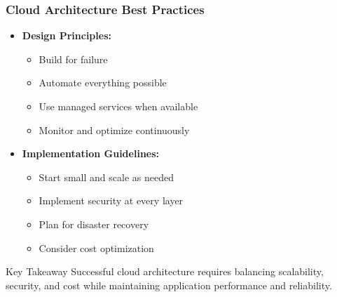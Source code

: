 \documentclass{beamer}
\begin{document}
\begin{frame}
    \frametitle{Cloud Architecture Best Practices}
    
    \begin{itemize}
        \item \textbf{Design Principles:}
        \begin{itemize}
            \item Build for failure
            \item Automate everything possible
            \item Use managed services when available
            \item Monitor and optimize continuously
        \end{itemize}
        
        \item \textbf{Implementation Guidelines:}
        \begin{itemize}
            \item Start small and scale as needed
            \item Implement security at every layer
            \item Plan for disaster recovery
            \item Consider cost optimization
        \end{itemize}
    \end{itemize}
    
    \begin{alertblock}{Key Takeaway}
        Successful cloud architecture requires balancing scalability, security, and cost while maintaining application performance and reliability.
    \end{alertblock}
\end{frame}
\end{document}
